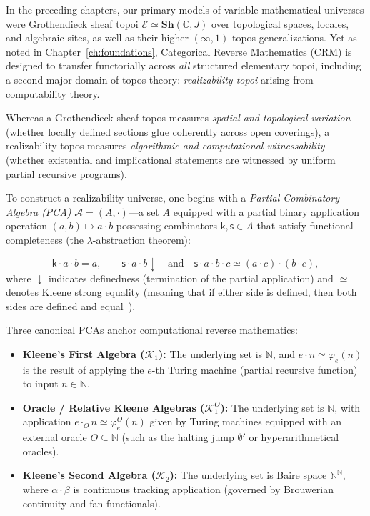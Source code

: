 \documentclass[10pt,twoside,openright]{book}
\theoremstyle{crmplain}
\theoremstyle{crmdef}
\theoremstyle{crmremark}
\begin{document}
In the preceding chapters, our primary models of variable mathematical universes were Grothendieck sheaf topoi $\mathcal{E} \simeq \mathbf{Sh}(\mathbb{C}, J)$ over topological spaces, locales, and algebraic sites, as well as their higher $(\infty, 1)$-topos generalizations. Yet as noted in Chapter~\ref{ch:foundations}, Categorical Reverse Mathematics ($\mathrm{CRM}$) is designed to transfer functorially across \emph{all} structured elementary topoi, including a second major domain of topos theory: \emph{realizability topoi} arising from computability theory.

Whereas a Grothendieck sheaf topos measures \emph{spatial and topological variation} (whether locally defined sections glue coherently across open coverings), a realizability topos measures \emph{algorithmic and computational witnessability} (whether existential and implicational statements are witnessed by uniform partial recursive programs).

To construct a realizability universe, one begins with a \emph{Partial Combinatory Algebra (PCA)} $\mathcal{A} = (A, \cdot)$---a set $A$ equipped with a partial binary application operation $(a, b) \mapsto a \cdot b$ possessing combinators $\mathsf{k}, \mathsf{s} \in A$ that satisfy functional completeness (the $\lambda$-abstraction theorem):

\[
  \mathsf{k} \cdot a \cdot b = a, \qquad \mathsf{s} \cdot a \cdot b \downarrow \quad \text{and} \quad \mathsf{s} \cdot a \cdot b \cdot c \simeq (a \cdot c) \cdot (b \cdot c),
\]
where $\downarrow$ indicates definedness (termination of the partial application) and $\simeq$ denotes Kleene strong equality (meaning that if either side is defined, then both sides are defined and equal~\cite[Ch.~1, \S\S 1.1--1.4]{vanOosten08}).

Three canonical PCAs anchor computational reverse mathematics:

\begin{itemize}[leftmargin=1.5em]

  \item \textbf{Kleene's First Algebra ($\mathcal{K}_1$):} The underlying set is $\mathbb{N}$, and $e \cdot n \simeq \varphi_e(n)$ is the result of applying the $e$-th Turing machine (partial recursive function) to input $n \in \mathbb{N}$.

  \item \textbf{Oracle / Relative Kleene Algebras ($\mathcal{K}_1^O$):} The underlying set is $\mathbb{N}$, with application $e \cdot_O n \simeq \varphi_e^O(n)$ given by Turing machines equipped with an external oracle $O \subseteq \mathbb{N}$ (such as the halting jump $\emptyset'$ or hyperarithmetical oracles).

  \item \textbf{Kleene's Second Algebra ($\mathcal{K}_2$):} The underlying set is Baire space $\mathbb{N}^\mathbb{N}$, where $\alpha \cdot \beta$ is continuous tracking application (governed by Brouwerian continuity and fan functionals).

\end{itemize}
\end{document}
